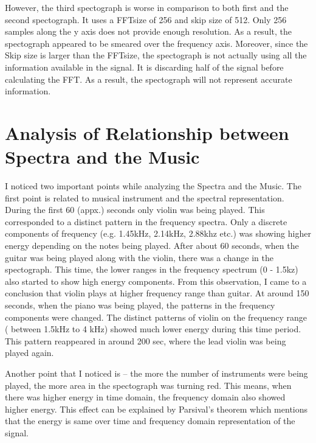 \documentclass[12pt]{article}
\begin{document}
However, the third spectograph is worse in comparison to both first and the second spectograph. It uses a FFTsize of 256 and skip size of 512. Only 256 samples along the y axis does not provide enough resolution. As a result, the spectograph appeared to be smeared over the frequency axis. Moreover, since the Skip size is larger than the FFTsize, the spectograph is not actually using all the information available in the signal. It is discarding half of the signal before calculating the FFT. As a result, the spectograph will not represent accurate information.

\section{Analysis of Relationship between Spectra and the Music}
I noticed two important points while analyzing the Spectra and the Music. The first point is related to musical instrument and the spectral representation. During the first 60 (appx.) seconds only violin was being played. This corresponded to a distinct pattern in the frequency spectra. Only a discrete components of frequency (e.g. 1.45kHz, 2.14kHz, 2.88khz etc.) was showing higher energy depending on the notes being played. After about 60 seconds, when the guitar was being played along with the violin, there was a change in the spectograph. This time, the lower ranges in the frequency spectrum (0 - 1.5kz) also started to show high energy components. From this observation, I came to a conclusion that violin plays at higher frequency range than guitar. At around 150 seconds, when the piano was being played, the patterns in the frequency components were changed. The distinct patterns of violin on the frequency range ( between 1.5kHz to 4 kHz) showed much lower energy during this time period. This pattern reappeared in around 200 sec, where the lead violin was being played again. 

Another point that I noticed is -- the more the number of instruments were being played, the more area in the spectograph was turning red. This means, when there was higher energy in time domain, the frequency domain also showed higher energy. This effect can be explained by Parsival's theorem which mentions that the energy is same over time and frequency domain representation of the signal.
\end{document}
